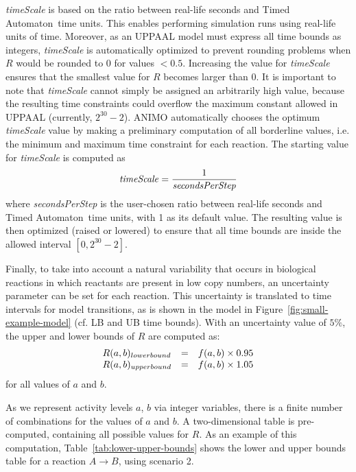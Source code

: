 \documentclass[journal, 10pt]{IEEEtran}
\def\ta{Timed Automaton}
\begin{document}
{\it timeScale} is based on the ratio between real-life seconds and \ta\ time units. This enables performing simulation runs using
real-life units of time. Moreover, as an UPPAAL model must express all time bounds as integers,
{\it timeScale} is automatically optimized to prevent rounding problems when $R$ would be rounded to 0 for values $< 0.5$.
Increasing the value for {\it timeScale} ensures that the smallest value for $R$ becomes larger than 0.
It is important to note that {\it timeScale} cannot simply be assigned an arbitrarily high value, because  
the resulting time constraints could overflow the maximum constant allowed in UPPAAL (currently, $2^{30}-2$).
ANIMO automatically chooses the optimum {\it timeScale} value by making a preliminary
computation of all borderline values, i.e. the minimum and maximum time constraint for each reaction.
The starting value for {\it timeScale} is computed as
$$
\mbox{\it timeScale} = \frac{1}{\mbox{\it secondsPerStep}}
$$
where {\it secondsPerStep} is the user-chosen ratio between real-life seconds and \ta\ time units, with 1 as its default value.
The resulting value is then optimized (raised or lowered) to ensure that all time bounds are inside the allowed interval $[0, 2^{30}-2]$.

Finally, to take into account a natural variability that occurs in biological reactions in which reactants are 
present in low copy numbers, an uncertainty parameter can be set for each reaction.
This uncertainty is translated to time intervals for model transitions, as is shown in the model in Figure~\ref{fig:small-example-model} (cf. {\sf LB} and {\sf UB} time bounds).
With an uncertainty value of $5 \%$, the upper and lower bounds of $R$ are computed as:
$$
\begin{array}{lcl}
R(a, b)_{\mbox{\scriptsize lower bound}} &=& f(a, b) \times 0.95 \\
R(a, b)_{\mbox{\scriptsize upper bound}} &=& f(a, b) \times 1.05
\end{array}
$$
for all values of $a$ and $b$. 

As we represent activity levels $a$, $b$ via integer variables, there is a finite number of
combinations for the values of $a$ and $b$. A two-dimensional table is pre-computed, containing all possible values for $R$. 
As an example of this computation, Table~\ref{tab:lower-upper-bounds} shows the lower and upper
bounds table for a reaction $A \rightarrow B$, using scenario 2. 
\end{document}
